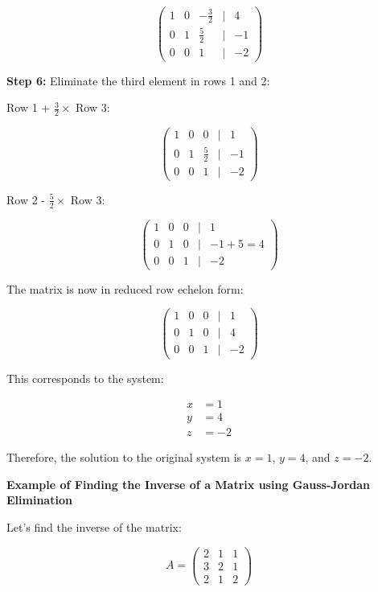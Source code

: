 \[
    \begin{pmatrix}
    1 & 0 & -\frac{3}{2} & | & 4 \\
    0 & 1 & \frac{5}{2} & | & -1 \\
    0 & 0 & 1 & | & -2
    \end{pmatrix}
\]

\textbf{Step 6:} Eliminate the third element in rows 1 and 2:

Row 1 + \(\frac{3}{2} \times\) Row 3:

\[
    \begin{pmatrix}
    1 & 0 & 0 & | & 1 \\
    0 & 1 & \frac{5}{2} & | & -1 \\
    0 & 0 & 1 & | & -2
    \end{pmatrix}
\]

Row 2 - \(\frac{5}{2} \times\) Row 3:

\[
    \begin{pmatrix}
    1 & 0 & 0 & | & 1 \\
    0 & 1 & 0 & | & -1 + 5 = 4 \\
    0 & 0 & 1 & | & -2
    \end{pmatrix}
\]

The matrix is now in reduced row echelon form:

\[
    \begin{pmatrix}
    1 & 0 & 0 & | & 1 \\
    0 & 1 & 0 & | & 4 \\
    0 & 0 & 1 & | & -2
    \end{pmatrix}
\]

This corresponds to the system:

\begin{align*}
    x &= 1 \\
    y &= 4 \\
    z &= -2
\end{align*}

Therefore, the solution to the original system is \(x = 1\), \(y = 4\), and \(z = -2\).
\vspace{\baselineskip}

\textbf{Example of Finding the Inverse of a Matrix using Gauss-Jordan Elimination}
\vspace{\baselineskip}

Let's find the inverse of the matrix:

\[
    A = 
    \begin{pmatrix}
    2 & 1 & 1 \\
    3 & 2 & 1 \\
    2 & 1 & 2
    \end{pmatrix}
\]

